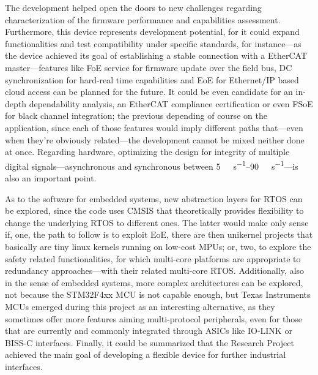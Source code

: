 The development helped open the doors to new challenges regarding characterization of the firmware performance and capabilities assessment.
Furthermore, this device represents development potential, for it could expand functionalities and test compatibility under specific standards, 
for instance---as the device achieved its goal of establishing a stable connection with a EtherCAT master---features like FoE service for firmware
update over the field bus, DC synchronization for hard-real time capabilities and EoE for Ethernet/IP based cloud access can be planned
for the future. It could be even candidate for an in-depth dependability analysis, an EtherCAT compliance certification or even FSoE for black channel 
integration; the previous depending of course on the application, since each of those features would imply different paths that---even when
they're obviously related---the development cannot be mixed neither done at once.
Regarding hardware, optimizing the design for integrity of multiple digital signals---asynchronous and synchronous between 
\SIrange{5}{90}{\mega\bit\per\second}---is also an important point. 

As to the software for embedded systems, new abstraction layers for RTOS can be explored, since the 
code uses CMSIS that theoretically provides flexibility to change the underlying RTOS to different ones. The latter would make only sense
if, one, the path to follow is to exploit EoE, there are then unikernel projects that basically are tiny linux kernels running on low-cost MPUs; or, two,
to explore the safety related functionalities, for which multi-core platforms are appropriate to redundancy approaches---with their related multi-core RTOS. 
Additionally,
also in the sense of embedded systems, more complex architectures can be explored, not because the STM32F4xx MCU is not capable enough, but 
Texas Instruments MCUs emerged during this project as an interesting alternative, as they sometimes offer more features aiming multi-protocol peripherals, 
even for those 
that are currently and commonly integrated through ASICs like IO-LINK or BISS-C interfaces.
Finally, it could be summarized that the Research Project achieved the main goal of developing a flexible device for further industrial interfaces.



